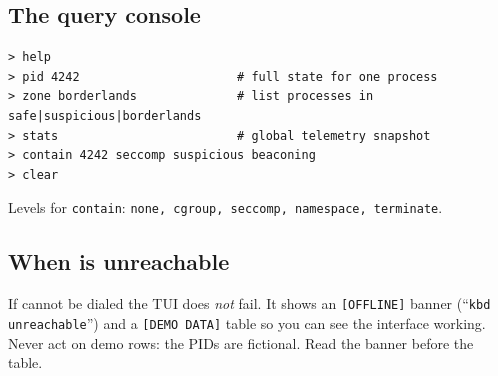 \subsection{The query console}
\begin{lstlisting}[style=console]
> help
> pid 4242                      # full state for one process
> zone borderlands              # list processes in safe|suspicious|borderlands
> stats                         # global telemetry snapshot
> contain 4242 seccomp suspicious beaconing
> clear
\end{lstlisting}
Levels for \texttt{contain}: \texttt{none, cgroup, seccomp, namespace, terminate}.

\subsection{When  is unreachable}
If  cannot be dialed the TUI does \emph{not} fail. It shows an
\texttt{[OFFLINE]} banner (``\texttt{kbd unreachable}'') and a \texttt{[DEMO DATA]} table so you can see the
interface working. Never act on demo rows: the PIDs are fictional. Read the banner before the table.
